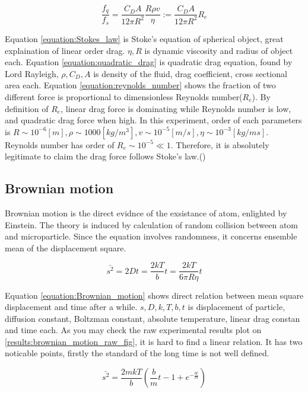 \documentclass{article}
\begin{document}
\begin{equation}
    \frac{f_q}{f_s} = \frac{C_D A}{12 \pi R^2} \frac{R \rho v}{\eta} := \frac{C_D A}{12 \pi R^2} R_e 
\label{equation:reynolds_number}
\end{equation}

Equation \ref{equation:Stokes_law} is Stoke's equation of spherical object, great explaination of linear order drag. $\eta, R$ is dynamic viscosity and radius of object each.
Equation \ref{equation:quadratic_drag} is quadratic drag equation, found by Lord Rayleigh, $\rho, C_D, A$ is density of the fluid, drag coefficient, cross sectional area each.
Equation \ref{equation:reynolds_number} shows the fraction of two different force is proportional to dimensionless Reynolds number($R_e$).
By definition of $R_e$, linear drag force is dominating while Reynolds number is low, and quadratic drag force when high.
In this experiment, order of each parameters is $R \sim 10^{-6} [m], \rho \sim 1000 [kg/m^3], v \sim 10^{-5} [m/s],\eta \sim 10^{-3} [kg / m s]$.
Reynolds number has order of $R_e \sim 10^{-5} \ll 1$.
Therefore, it is absolutely legitimate to claim the drag force follows Stoke's law.(\cite{Reynolds_number})

\subsection{Brownian motion}
\label{intro:Brownian_motion}

Brownian motion is the direct evidnce of the exsistance of atom, enlighted by Einstein.
The theory is induced by calculation of random collision between atom and microparticle.
Since the equation involves randomness, it concerns ensemble mean of the displacement square.

\begin{equation}
    \bar{s^2}= 2Dt =  \frac{2kT}{b} t  = \frac{2kT}{6 \pi R \eta} t
\label{equation:Brownian_motion}
\end{equation}

Equation \ref{equation:Brownian_motion} shows direct relation between mean square displacement and time after a while.
$s, D, k, T, b, t$ is displacement of particle, diffusion constant, Boltzman constant, absolute temperature, linear drag constan and time each.
As you may check the raw experimental results plot on \ref{results:brownian_motion_raw_fig}, it is hard to find a linear relation.
It has two noticable points, firstly the standard of the long time is not well defined.

\begin{equation}
    \bar{s^2} = \frac{2 m k T}{b} (\frac{b}{m}t -1 + e^{-\frac{bt}{m}})
\label{equation:Brownian_motion_Ostein}
\end{equation}
\end{document}
